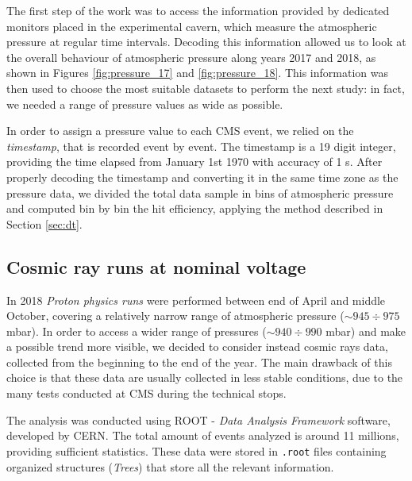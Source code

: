 \documentclass[12pt,twoside,a4paper]{report}
\numberwithin{equation}{section}
\begin{document}
The first step of the work was to access the information provided by dedicated monitors placed in the experimental cavern, which measure the atmospheric pressure at regular time intervals. Decoding this information allowed us to look at the overall behaviour of atmospheric pressure along years 2017 and 2018, as shown in Figures \ref{fig:pressure_17} and \ref{fig:pressure_18}. This information was then used to choose the most suitable datasets to perform the next study: in fact, we needed a range of pressure values as wide as possible.

In order to assign a pressure value to each CMS event, we relied on the \textit{timestamp}, that is recorded event by event. The timestamp is a 19 digit integer, providing the time elapsed from January 1st 1970 with accuracy of 1 \textmu s.
After properly decoding the timestamp and converting it in the same time zone as the pressure data, we divided the total data sample in bins of atmospheric pressure and computed bin by bin the hit efficiency, applying the method described in Section \ref{sec:dt}.


\subsection{Cosmic ray runs at nominal voltage}
In 2018 \textit{Proton physics runs} were performed between end of April and middle October, covering a relatively narrow range of atmospheric pressure ($\sim 945 \div 975$ mbar). In order to access a wider range of pressures ($\sim 940 \div 990$ mbar) and make a possible trend more visible, we decided to consider instead cosmic rays data, collected from the beginning to the end of the year. The main drawback of this choice is that these data are usually collected in less stable conditions, due to the many tests conducted at CMS during the technical stops.

The analysis was conducted using ROOT - \textit{Data Analysis Framework} software, developed by CERN. \cite{root} The total amount of events analyzed is around 11 millions, providing sufficient statistics. These data were stored in \texttt{.root} files containing organized structures (\textit{Trees}) that store all the relevant information.
\end{document}
